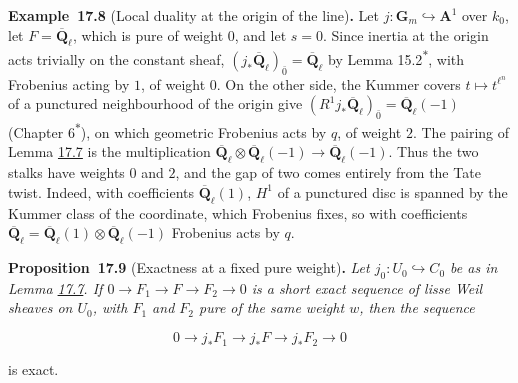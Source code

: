 \documentclass[11pt]{article}
\newenvironment{bpstatement}[2]{\par\addvspace{0.6\baselineskip}\noindent\textbf{#1}#2\textbf{.}\enspace\ignorespaces}
  {\par\addvspace{0.4\baselineskip}}
\newenvironment{bpstatementit}[2]{\begin{bpstatement}{#1}{#2}\itshape\ignorespaces}{\end{bpstatement}}
\newcommand{\bpout}[1]{#1\textsuperscript{\hyperlink{bp-outside}{\ensuremath{\ast}}}}
\begin{document}
\label{bp26}%
\begin{bpstatement}{Example~17.8}{ (Local duality at the origin of the line)}
Let \(j:\mathbf G_m\hookrightarrow\mathbf A^1\) over \(k_0\), let \(F=\overline{\mathbf Q}_\ell\), which is pure of weight \(0\), and let \(s=0\). Since inertia at the origin acts trivially on the constant sheaf, \((j_*\overline{\mathbf Q}_\ell)_{\bar 0}=\overline{\mathbf Q}_\ell\) by Lemma \bpout{15.2}, with Frobenius acting by \(1\), of weight \(0\). On the other side, the Kummer covers \(t\mapsto t^{\ell^n}\) of a punctured neighbourhood of the origin give \((R^1j_*\overline{\mathbf Q}_\ell)_{\bar 0}=\overline{\mathbf Q}_\ell(-1)\) (Chapter \bpout{6}), on which geometric Frobenius acts by \(q\), of weight \(2\). The pairing of Lemma \hyperref[bp23]{17.7} is the multiplication \(\overline{\mathbf Q}_\ell\otimes\overline{\mathbf Q}_\ell(-1)\to\overline{\mathbf Q}_\ell(-1)\). Thus the two stalks have weights \(0\) and \(2\), and the gap of two comes entirely from the Tate twist. Indeed, with coefficients \(\overline{\mathbf Q}_\ell(1)\), \(H^1\) of a punctured disc is spanned by the Kummer class of the coordinate, which Frobenius fixes, so with coefficients \(\overline{\mathbf Q}_\ell=\overline{\mathbf Q}_\ell(1)\otimes\overline{\mathbf Q}_\ell(-1)\) Frobenius acts by \(q\).
\end{bpstatement}

\label{bp27}%
\begin{bpstatementit}{Proposition~17.9}{ (Exactness at a fixed pure weight)}
Let \(j_0:U_0\hookrightarrow C_0\) be as in Lemma \hyperref[bp23]{17.7}. If \(0\to F_1\to F\to F_2\to0\) is a short exact sequence of lisse Weil sheaves on \(U_0\), with \(F_1\) and \(F_2\) pure of the same weight \(w\), then the sequence

\[
0\longrightarrow j_*F_1\longrightarrow j_*F
\longrightarrow j_*F_2\longrightarrow0
\]

is exact.
\end{bpstatementit}
\end{document}
